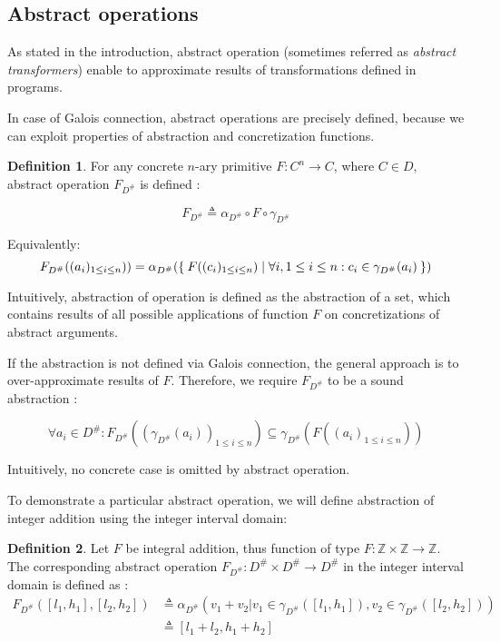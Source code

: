 \documentclass[12pt,oneside]{fithesis2}
\theoremstyle{definition}
\newtheorem{definition}{Definition}
\begin{document}
\subsection{Abstract operations}\label{sec:operations}

As stated in the introduction, abstract operation (sometimes referred as \textit{abstract transformers}) enable to approximate results of transformations defined in programs.

In case of Galois connection, abstract operations are precisely defined, because we can exploit properties of abstraction and concretization functions.

\begin{definition}\label{def:operation-galois}
  For any concrete $n$-ary primitive $F: C^n \to C$, where $C \in D$, abstract operation $F_{D^\#}$ is defined \cite{mine-AIAA10}:

  \[
    F_{D^\#} \triangleq \alpha_{D^\#} \circ F \circ \gamma_{D^\#}
  \]

  Equivalently:
  \[
    F_{D^\#}((a_i)_{1 \le i \le n})) =  \alpha_{D^\#}(\Set{F((c_i)_{1 \le i \le n}) | \forall i, 1 \le i \le n: c_i \in \gamma_{D^\#}(a_i)})
  \]
\end{definition}

Intuitively, abstraction of operation is defined as the abstraction of a set, which contains results of all possible applications of function $F$ on concretizations of abstract arguments.

If the abstraction is not defined via Galois connection, the general approach is to over-approximate results of $F$. Therefore, we require $F_{D^\#}$ to be a sound abstraction \cite{CousotEtAl06-ASIAN}:

\[
  \forall a_i \in D^\#: F_{D^\#}((\gamma_{D^\#}(a_i))_{1 \le i \le n}) \subseteq \gamma_{D^\#}(F((a_i)_{1 \le i \le n}))
\]

Intuitively, no concrete case is omitted by abstract operation.

To demonstrate a particular abstract operation, we will define abstraction of integer addition using the integer interval domain:

\begin{definition}
  Let $F$ be integral addition, thus function of type $F: \mathbb Z \times \mathbb Z \to \mathbb Z$. The corresponding abstract operation $F_{D^\#}: D^\# \times D^\# \to D^\#$ in the integer interval domain is defined as \cite{mine-WING12}:
  \begin{align*}
    F_{D^\#}([l_1, h_1], [l_2, h_2]) &\triangleq \alpha_{D^\#}\left( v_1 + v_2 | v_1 \in \gamma_{D^\#}([l_1, h_1]), v_2 \in \gamma_{D^\#}([l_2, h_2]) \right)\\
    &\triangleq [l_1 + l_2, h_1 + h_2]
  \end{align*}
\end{definition}
\end{document}
